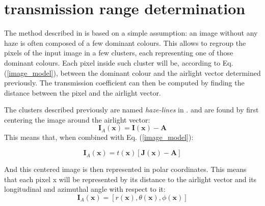 \documentclass[conference]{IEEEtran}
\begin{document}
\section{transmission range determination}
The method described in \cite{dehaze} is based on a simple assumption: an image without any haze is often composed of a few dominant colours. This allows to regroup the pixels of the input image in a few clusters, each representing one of those dominant colours. Each pixel inside such cluster will be, according to Eq. (\ref{image_model}), between the dominant colour and the airlight vector determined previously. The transmission coefficient can then be computed by finding the distance between the pixel and the airlight vector.\par
The clusters described previously are named \textit{haze-lines} in \cite{dehaze}. and are found by first centering the image around the airlight vector:
\begin{equation}
    \label{eq:centered_image}
    \mathbf{I}_A(\mathbf{x}) = \mathbf{I}(\mathbf{x}) - \mathbf{A}
\end{equation}
This means that, when combined with Eq. (\ref{image_model}):

\begin{equation}
    \label{eq:centered_image_model}
    \mathbf{I}_A(\mathbf{x}) = t(\mathbf{x}) \left[\mathbf{J}(\mathbf{x}) - \mathbf{A}\right]
\end{equation}

And this centered image is then represented in polar coordinates. This means that each pixel x will be represented by its distance to the airlight vector and its longitudinal and azimuthal angle with respect to it:
\begin{equation}
    \label{eq:polar_coordinates}
    \mathbf{I}_A(\mathbf{x}) = \left[r(\mathbf{x}), \theta(\mathbf{x}), \phi(\mathbf{x})\right]
\end{equation}
\end{document}
